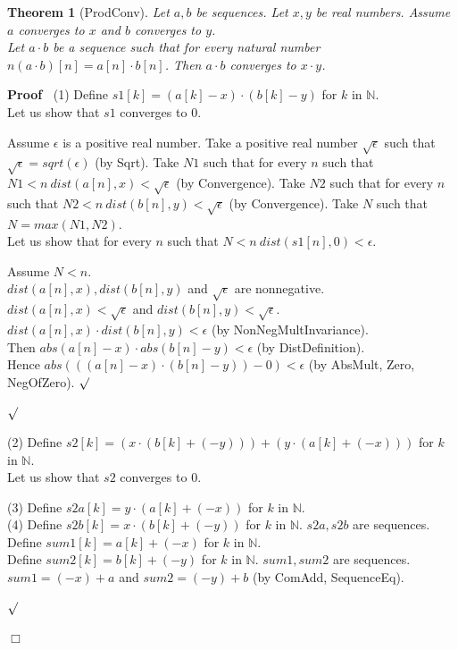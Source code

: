 \documentclass{article}
\newenvironment{forthel}{\begin{leftbar}}{\end{leftbar}}
\newenvironment{proof}{\noindent\textbf{Proof\ }}{\hspace*{\fill}$\Box$\medskip}
\newenvironment{subproof}{\begin{list}{}{}
		\item[\text{Proof}]}{\hfill $\surd$ \end{list}}
\newtheorem{theorem}{Theorem}
\newcommand{\NN}{\mathbb{N}}
\newcommand{\cdotone}{\cdot}
\newcommand{\plustwo}{+}
\newcommand{\rooteps}{\sqrt{\epsilon}}
\begin{document}
\begin{forthel}
	\begin{theorem}[ProdConv]
	Let $a,b$ be sequences. Let $x,y$ be real numbers. Assume $a$ converges to $x$ and $b$ converges to $y$.
	\\Let $a \cdotone b$ be a sequence such that for every natural number $n (a \cdotone b)[n] = a[n] \cdot b[n]$.
	Then $a \cdotone b$ converges to $x \cdot y$.
	\end{theorem}
	\begin{proof}
	(1) Define $s1[k] = (a[k] - x) \cdot (b[k] - y)$ for $k$ in $\NN$.
	\\Let us show that $s1$ converges to $0$. 
	\begin{subproof}
    Assume $\epsilon$ is a positive real number. 
    Take a positive real number $\rooteps$ such that $\rooteps = sqrt(\epsilon)$ (by Sqrt).
    Take $N1$ such that for every $n$ such that $N1 < n \ dist(a[n],x) < \rooteps$ (by Convergence).
    Take $N2$ such that for every $n$ such that $N2 < n \ dist(b[n],y) < \rooteps$ (by Convergence).
    Take $N$ such that $N = max(N1,N2)$.
    \\Let us show that for every $n$ such that $N < n \ dist(s1[n],0) < \epsilon$.
    \begin{subproof}
    Assume $N < n$.
    \\$dist(a[n],x), dist(b[n],y)$ and $\rooteps$ are nonnegative.
    \\$dist(a[n],x) < \rooteps$ and $dist(b[n],y) < \rooteps$.
    \\$dist(a[n],x) \cdot dist(b[n],y) < \epsilon$ (by NonNegMultInvariance).
    \\Then $abs(a[n] - x) \cdot abs(b[n] - y) < \epsilon$ (by DistDefinition).
    \\Hence $abs(((a[n] - x) \cdot (b[n] - y)) - 0) < \epsilon$ (by AbsMult,  Zero, NegOfZero).
    \end{subproof}
	\end{subproof}
	(2) Define $s2[k] = (x \cdot (b[k] + (-y))) + (y \cdot (a[k] + (-x)))$ for $k$ in $\NN$.
	\\Let us show that $s2$ converges to $0$.
	\begin{subproof}
	(3) Define $s2a[k] = y \cdot (a[k] + (-x))$ for $k$ in $\NN$.
	\\(4) Define $s2b[k] = x \cdot (b[k] + (-y))$ for $k$ in $\NN$.
	$s2a, s2b$ are sequences.
	Define $sum1[k] = a[k] + (-x)$ for $k$ in $\NN$.
	\\Define $sum2[k] = b[k] + (-y)$ for $k$ in $\NN$.
	$sum1, sum2$ are sequences.
	\\$sum1 = (-x) \plustwo a$ and $sum2 = (-y) \plustwo b$ (by ComAdd, SequenceEq).

\end{subproof}
\end{proof}
\end{forthel}
\end{document}
